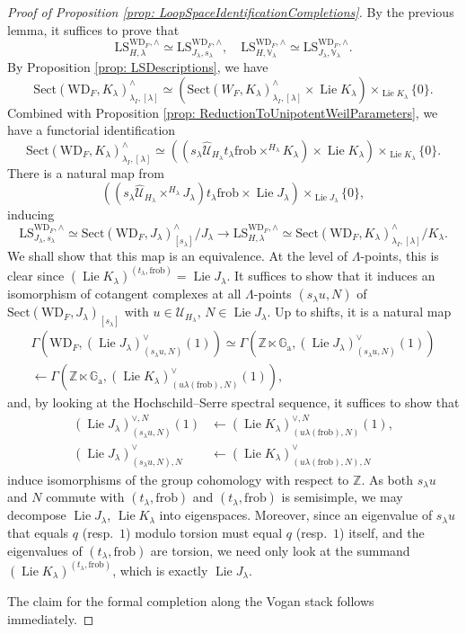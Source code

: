 \documentclass{amsart}
\theoremstyle{definition}
\theoremstyle{remark}
\numberwithin{equation}{section}
\DeclareMathOperator{\Lie}{Lie}
\newcommand{\mc}{\mathcal}
\newcommand{\Z}{\mathbb{Z}}
\newcommand{\wh}{\widehat}
\newcommand{\frob}{\mathrm{frob}}
\newcommand{\V}{\mathbb{V}}
\newcommand{\WD}{\mathrm{WD}}
\newcommand{\Ga}{\mathbb{G}_{\mathrm{a}}}
\newcommand{\LS}{\mathrm{LS}}
\newcommand{\Sect}{\mathrm{Sect}}
\begin{document}
\begin{proof}[Proof of Proposition \ref{prop: LoopSpaceIdentificationCompletions}]
By the previous lemma, it suffices to prove that
\[
\LS_{H, \lambda}^{\WD_F, \wedge} \simeq \LS_{J_\lambda, s_\lambda}^{\WD_F, \wedge}, \quad
\LS_{H, \V_\lambda}^{\WD_F, \wedge} \simeq \LS_{J_\lambda, \V_\lambda}^{\WD_F, \wedge}. 
\]
By Proposition \ref{prop: LSDescriptions}, we have
\[
\Sect(\WD_F, K_\lambda)^{\wedge}_{\lambda_I, [\lambda]} \simeq (\Sect (W_F, K_\lambda)_{\lambda_I, [\lambda]}^{\wedge}\times \Lie K_\lambda)\times_{\Lie K_\lambda}\{0\}. 
\]
Combined with Proposition \ref{prop: ReductionToUnipotentWeilParameters}, we have a functorial identification
\[
\Sect (\WD_F, K_\lambda)^{\wedge}_{\lambda_I, [\lambda]} \simeq ((s_\lambda \wh{\mc U}_{H_\lambda}t_\lambda\frob \times^{H_\lambda} K_\lambda) \times \Lie K_\lambda )\times_{\Lie K_\lambda } \{0\}. 
\]
There is a natural map from 
\[
((s_\lambda \wh{\mc U}_{H_\lambda}\times^{H_\lambda} J_\lambda)t_\lambda\frob \times \Lie J_\lambda )\times_{\Lie J_\lambda } \{0\}, 
\]
inducing
\[
\LS^{\WD_F, \wedge}_{J_\lambda, s_\lambda}\simeq\Sect (\WD_F, J_\lambda)^{\wedge}_{[s_\lambda]}/ J_\lambda \to
\LS^{\WD_F, \wedge}_{H, \lambda}\simeq\Sect(\WD_F, K_\lambda)^{\wedge}_{\lambda_I, [\lambda]}/K_\lambda. 
\]
We shall show that this map is an equivalence. At the level of $\Lambda$-points, this is clear since $(\Lie K_\lambda)^{(t_\lambda,\frob)}=\Lie J_\lambda$. 
It suffices to show that it induces an isomorphism of cotangent complexes at all $\Lambda$-points $(s_\lambda u, N)$ of $\Sect (\WD_F, J_\lambda)_{[s_\lambda]}$ with $u\in \mc{U}_{H_\lambda}$, $N\in \Lie J_\lambda$. Up to shifts, it is a natural map
\begin{multline*}
\Gamma (\WD_F, (\Lie J_{\lambda})_{(s_\lambda u, N)}^{\vee}(1))\simeq
\Gamma (\Z\ltimes \Ga, (\Lie J_{\lambda})_{(s_\lambda u, N)}^{\vee}(1))
\\
\leftarrow\Gamma (\Z\ltimes \Ga, (\Lie K_\lambda)_{(u\lambda(\frob), N)}^{\vee}(1)),     
\end{multline*}
and, by looking at the Hochschild--Serre spectral sequence, it suffices to show that
\begin{align*}
(\Lie J_{\lambda})_{(s_\lambda u, N)}^{\vee, N}(1)&\leftarrow
(\Lie K_{\lambda})_{(u\lambda (\frob), N)}^{\vee, N}(1), \\
(\Lie J_{\lambda})_{(s_\lambda u, N), N}^{\vee}&\leftarrow
(\Lie K_{\lambda})_{(u\lambda (\frob), N), N}^{\vee}    
\end{align*}
induce isomorphisms of the group cohomology with respect to $\Z$. As both $s_\lambda u$ and $N$ commute with $(t_\lambda,\frob)$ and $(t_\lambda,\frob)$ is semisimple, we may decompose $\Lie J_\lambda$, $\Lie K_\lambda$ into eigenspaces. Moreover, since an eigenvalue of $s_\lambda u$ that equals $q$ (resp.~$1$) modulo torsion must equal $q$ (resp.~$1$) itself, and the eigenvalues of $(t_\lambda,\frob)$ are torsion, we need only look at the summand $(\Lie K_\lambda)^{(t_\lambda, \frob)}$, which is exactly $\Lie J_\lambda$. 

The claim for the formal completion along the Vogan stack follows immediately. 
\end{proof}
\end{document}
